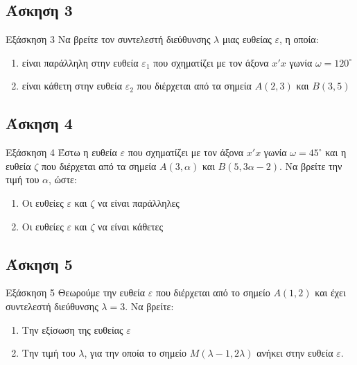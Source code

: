 \documentclass[greek]{beamer}
\begin{document}
\subsection{Άσκηση 3}
\begin{frame}[label=Άσκηση3]{Εξάσκηση 3}
 Να βρείτε τον συντελεστή διεύθυνσης $λ$ μιας ευθείας $ε$, η οποία:
 \begin{enumerate}
  \item<1-> είναι παράλληλη στην ευθεία $ε_1$ που σχηματίζει με τον άξονα $x'x$ γωνία $ω=120^{\circ}$
  \item<2-> είναι κάθετη στην ευθεία $ε_2$ που διέρχεται από τα σημεία $Α(2,3)$ και $Β(3,5)$
 \end{enumerate}

\end{frame}

\subsection{Άσκηση 4}
\begin{frame}[label=Άσκηση4]{Εξάσκηση 4}
 Έστω η ευθεία $ε$ που σχηματίζει με τον άξονα $x'x$ γωνία $ω=45^{\circ}$ και η ευθεία $ζ$ που διέρχεται από τα σημεία $Α(3,α)$ και $Β(5,3α-2)$. Να βρείτε την τιμή του $α$, ώστε:
 \begin{enumerate}
   \item<1-> Οι ευθείες $ε$ και $ζ$ να είναι παράλληλες
   \item<2-> Οι ευθείες $ε$ και $ζ$ να είναι κάθετες
 \end{enumerate}

\end{frame}

\subsection{Άσκηση 5}
\begin{frame}[label=Άσκηση5]{Εξάσκηση 5}
 Θεωρούμε την ευθεία $ε$ που διέρχεται από το σημείο $Α(1,2)$ και έχει συντελεστή διεύθυνσης $λ=3$. Να βρείτε:
 \begin{enumerate}
   \item<1-> Την εξίσωση της ευθείας $ε$
   \item<2-> Την τιμή του $λ$, για την οποία το σημείο $Μ(λ-1,2λ)$ ανήκει στην ευθεία $ε$.
 \end{enumerate}

\end{frame}
\end{document}
